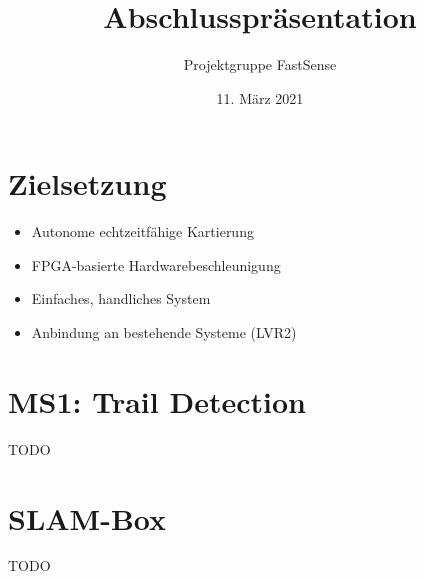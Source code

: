 \documentclass{beamer}
\title{Abschlusspräsentation}
\author{Projektgruppe FastSense}
\date{11. März 2021}
\begin{document}
{
\begin{frame}
\titlepage
\end{frame}}

\section{Zielsetzung}
\begin{frame}{\secname}
\begin{itemize}
\item Autonome echtzeitfähige Kartierung
\item FPGA-basierte Hardwarebeschleunigung
\item Einfaches, handliches System
\item Anbindung an bestehende Systeme (LVR2)
\end{itemize}
\end{frame}

\section{MS1: Trail Detection}
\begin{frame}{\secname}
TODO    
\end{frame}

\section{SLAM-Box}
\begin{frame}{\secname}
TODO
\end{frame}
\end{document}
